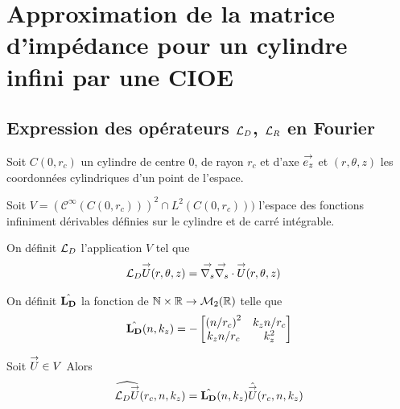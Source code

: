 \section{Approximation de la matrice d'impédance pour un cylindre infini par une CIOE}

  \subsection[Expression des opérateurs LD, LR en Fourier]{Expression des opérateurs \({\mathcal{L}_D}\), \({\mathcal{L}_R}\) en Fourier}
    Soit \(C(0,r_c)\) un cylindre de centre 0, de rayon \(r_c\) et d'axe \({\overset{\rightarrow}{e_z}}\) et \((r,\theta,z)\) les coordonnées cylindriques d'un point de l'espace.

    Soit \(V = \left(\mathcal{C}^\infty(C(0,r_c))\right)^2 \cap L^2(C(0,r_c)))\) l'espace des fonctions infiniment dérivables définies sur le cylindre et de carré intégrable.

    \begin{defn}
      \label{eq:cylindre:fourier:LD}
      On définit \({\mathcal{L}_D}\) l’application \(V\) tel que
      \begin{align*}
        {\mathcal{L}_D} {\overset{\rightarrow}{U}}(r,\theta,z) & = {\overset{\rightarrow}{\nabla_s}}{} {\overset{\rightarrow}{\nabla_s}} \cdot{} {\overset{\rightarrow}{U}}(r,\theta,z)
      \end{align*}

      On définit \(\hat{\mathbf{L_D}}\) la fonction de \(\mathbb N\times\mathbb R \rightarrow \mathcal{M}_2(\mathbb R)\) telle que
      \begin{equation*}
        \hat{\mathbf{L_D}}(n,k_z) = -
        \begin{bmatrix}
          \left({n}\slash{r_c}\right)^2 & k_z{n}\slash{r_c}
          \\
          k_z{n}\slash{r_c} & k_z^2
        \end{bmatrix}
      \end{equation*}
    \end{defn}

    \begin{prop}
      Soit \({\overset{\rightarrow}{U}} \in V\)
      Alors
      \begin{equation*}
        \widehat{{\mathcal{L}_D} {\overset{\rightarrow}{U}}} (r_c,n,k_z) = \hat{\mathbf{L_D}}(n,k_z) \hat{{\overset{\rightarrow}{U}}}(r_c,n,k_z)
      \end{equation*}
    \end{prop}

